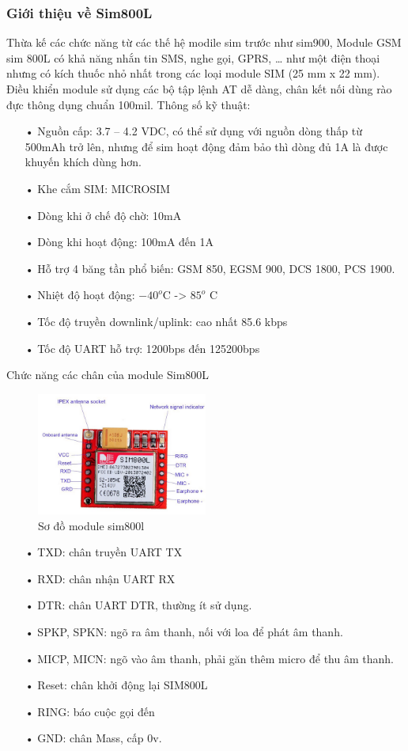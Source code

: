 \subsubsection*{Giới thiệu về Sim800L}
Thừa kế các chức năng từ các thế hệ modile sim trước như sim900, Module GSM sim 800L có khả năng nhắn tin SMS, nghe gọi, GPRS, … như một điện thoại nhưng có kích thuốc nhỏ nhất trong các loại module SIM (25 mm x 22 mm). Điều khiển module sử dụng các bộ tập lệnh AT dễ dàng, chân kết nối dùng rào đực thông dụng chuẩn 100mil.
Thông số kỹ thuật:
\begin{itemize}
	
	\item[•]Nguồn cấp: 3.7 – 4.2 VDC, có thể sử dụng với nguồn dòng thấp từ 500mAh trở lên, nhưng để sim hoạt động đảm bảo thì dòng đủ 1A là được khuyến khích dùng hơn.
	\item[•]Khe cắm SIM: MICROSIM
	\item[•]Dòng khi ở chế độ chờ: 10mA
	\item[•]Dòng khi hoạt động: 100mA đến 1A
	\item[•]Hỗ trợ 4 băng tần phổ biến: GSM 850, EGSM 900, DCS 1800, PCS 1900.
	\item[•]Nhiệt độ hoạt động: $-40^{o}$C -> $85^{o}$ C
	\item[•]Tốc độ truyền downlink/uplink: cao nhất 85.6 kbps
	\item[•]Tốc độ UART hỗ trợ: 1200bps đến 125200bps
\end{itemize}

Chức năng các chân của module Sim800L
\begin{figure}[H]
	\centering    
	\includegraphics[width=0.5\textwidth]{sim800l}
	\caption[Sơ đồ module sim800l]{Sơ đồ module sim800l}
	\label{fig:sim800l}
\end{figure}

\begin{itemize}
	\item[•]TXD: chân truyền UART TX
	\item[•]RXD: chân nhận UART RX
	\item[•]DTR: chân UART DTR, thường ít sử dụng.
	\item[•]SPKP, SPKN: ngõ ra âm thanh, nối với loa để phát âm thanh.
	\item[•]MICP, MICN: ngõ vào âm thanh, phải găn thêm micro để thu âm thanh.
	\item[•]Reset: chân khởi động lại SIM800L
	\item[•]RING: báo cuộc gọi đến
	\item[•]GND: chân Mass, cấp 0v.
\end{itemize}

